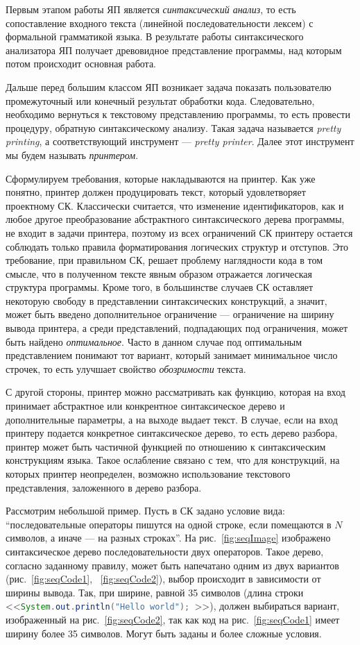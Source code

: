 Первым этапом работы ЯП является \emph{синтаксический анализ}, то есть
сопоставление входного текста (линейной последовательности лексем) с формальной
грамматикой языка. В результате работы синтаксического анализатора ЯП получает
древовидное представление программы, над которым потом происходит основная работа.

Дальше перед большим классом ЯП возникает задача показать пользователю
промежуточный или конечный результат обработки кода.
Следовательно, необходимо вернуться к текстовому представлению программы,
то есть провести процедуру, обратную синтаксическому анализу. Такая задача
называется \emph{pretty printing}, а соответствующий инструмент ---
\emph{pretty printer}. Далее этот инструмент мы будем называть
\emph{принтером}.

Сформулируем требования, которые накладываются на принтер.
Как уже понятно, принтер должен
продуцировать текст, который удовлетворяет проектному СК.
Классически считается, что изменение идентификаторов, как и любое другое
преобразование абстрактного синтаксического дерева программы, не входит в
задачи принтера, поэтому из всех ограничений СК принтеру остается 
соблюдать только правила форматирования логических структур и отступов.
Это требование, при правильном СК, решает проблему наглядности кода в том смысле,
что в полученном тексте явным образом отражается логическая структура программы.
Кроме того, в большинстве случаев СК оставляет некоторую свободу в представлении
синтаксических конструкций, а значит, может быть введено дополнительное
ограничение --- ограничение на ширину вывода принтера, а среди 
представлений, подпадающих под ограничения, может быть
найдено \emph{оптимальное}. Часто в данном случае под
оптимальным представлением понимают тот вариант,
который занимает минимальное число строчек,
то есть улучшает свойство \emph{обозримости} текста.

С другой стороны, принтер можно рассматривать как функцию,
которая на вход принимает
абстрактное или конкрентное синтаксическое дерево и дополнительные параметры,
а на выходе выдает текст. В случае, если на вход принтеру подается конкретное
синтаксическое дерево, то есть дерево разбора, принтер может быть частичной
функцией по отношению к синтаксическим конструкциям языка.
Такое ослабление связано
с тем, что для конструкций, на которых принтер неопределен, возможно использование
текстового представления, заложенного в дерево разбора.

Рассмотрим небольшой пример.
Пусть в СК задано условие вида: “последовательные операторы пишутся
на одной строке,
если помещаются в $N$ символов, а иначе --- на разных строках”.
На рис.~\ref{fig:seqImage} изображено синтаксическое дерево
последовательности двух операторов. Такое дерево, согласно заданному
правилу, может быть напечатано одним из
двух вариантов (рис.~\ref{fig:seqCode1}, ~\ref{fig:seqCode2}),
выбор происходит в зависимости от ширины вывода. Так, при ширине, равной
35 символов (длина строки
<<\lstinline[language = Java]{System.out.println("Hello world"); }>>),
должен выбираться вариант, изображенный на рис.~\ref{fig:seqCode2},
так как код на рис.~\ref{fig:seqCode1} имеет ширину более 35 символов.
Могут быть заданы и более сложные условия.

